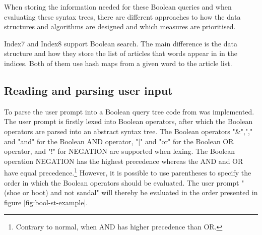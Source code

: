 When storing the information needed for these Boolean queries and when evaluating these syntax trees, there are different approaches to how the data structures and algorithms are designed and which measures are prioritised. 

Index7 and Index8 support Boolean search. The main difference is the data structure and how they store the list of articles that words appear in in the indices. Both of them use hash maps from a given word to the article list. 

\subsection{Reading and parsing user input}
To parse the user prompt into a Boolean query tree code from \cite{parsing_lexing} was implemented. The user prompt is firstly lexed into Boolean operators, after which the Boolean operators are parsed into an abstract syntax tree. The Boolean operators "\&","," and "and" for the Boolean AND operator, "|" and "or" for the Boolean OR operator, and "!" for NEGATION are supported when lexing. The Boolean operation NEGATION has the highest precedence whereas the AND and OR have equal precedence.\footnote{Contrary to normal, when AND has higher precedence than OR.} However, it is possible to use parentheses to specify the order in which the Boolean operators should be evaluated. The user prompt "(shoe or boot) and not sandal" will thereby be evaluated in the order presented in figure \ref{fig:bool-st-example}.

